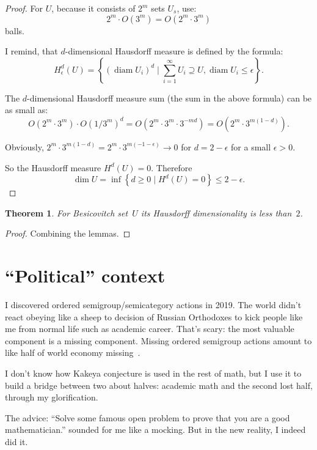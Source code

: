 \documentclass[oneside,draft]{amsart}
\newcommand{\setcond}[2]{\left\{#1\mid#2\right\}}
\newcommand{\diam}{\operatorname{diam}}
\newtheorem{thm}{Theorem}
\begin{document}
\begin{proof}
For \( U \), because it consists of \( 2^m \) sets \( U_s \), use:
\[
2^m \cdot O(3^m) = O(2^m \cdot 3^m)
\]
balls.

I remind, that $d$-di\-men\-sio\-nal Hausdorff measure is defined by the formula:
\[
H^d_{\epsilon}(U) = \setcond{(\diam U_i)^d}{\sum_{i=1}^\infty U_i\supseteq U, \diam U_i\leq\epsilon}.
\]

The $d$-di\-men\-sio\-nal Hausdorff measure sum (the sum in the above formula) can be as small as:
\[
O(2^m \cdot 3^m) \cdot O(1/3^m)^d = O(2^m\cdot 3^m\cdot 3^{-md}) = O(2^m\cdot 3^{m(1-d)}).
\]

Obviously, $2^m\cdot 3^{m(1-d)}=2^m\cdot 3^{m(-1-\epsilon)}\to 0$ for $d=2-\epsilon$ for a small $\epsilon>0$.

So the Hausdorff measure $H^d(U)=0$. Therefore \[ \dim U=\inf\setcond{d\geq 0}{H^d(U)=0}\leq 2-\epsilon. \]

\end{proof}

\begin{thm}
For Besicovitch set~$U$ its Hausdorff dimensionality is less than~$2$.
\end{thm}

\begin{proof}
Combining the lemmas. 
\end{proof}

\section{``Political'' context}

I discovered ordered semigroup/semicategory actions in 2019. The world didn't react obeying like a sheep to decision of Russian Orthodoxes to kick people like me from normal life such as academic career. That's scary: the most valuable component is a missing component. Missing ordered semigroup actions amount to like half of world economy missing~\cite{osa-important}.

I don't know how Kakeya conjecture is used in the rest of math, but I use it to build a bridge between two about halves: academic math and the second lost half, through my glorification.

The advice: ``Solve some famous open problem to prove that you are a good mathematician.'' sounded for me like a mocking. But in the new reality, I indeed did it.



\end{document}
